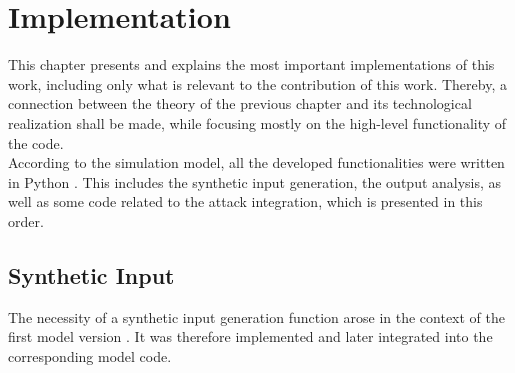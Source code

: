 \chapter{Implementation} %
\label{chap:implementation}
This chapter presents and explains the most important implementations of this work, including only what is relevant to the contribution of this work. Thereby, a connection between the theory of the previous chapter and its technological realization shall be made, while focusing mostly on the high-level functionality of the code.\\
According to the simulation model, all the developed functionalities were written in Python \cite{van1995python}. This includes the synthetic input generation, the output analysis, as well as some code related to the attack integration, which is presented in this order. 


\section{Synthetic Input}
The necessity of a synthetic input generation function arose in the context of the first model version \cite{HippSimModel.1}. It was therefore implemented and later integrated into the corresponding model code.

